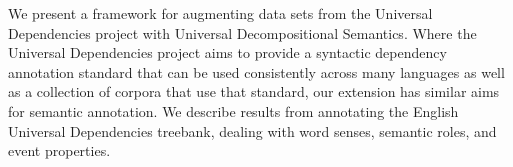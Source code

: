 We present a framework for augmenting data sets from the Universal Dependencies project with Universal Decompositional Semantics. Where the Universal Dependencies project aims to provide a syntactic dependency annotation standard that can be used consistently across many languages as well as a collection of corpora that use that standard, our extension has similar aims for semantic annotation. We describe results from annotating the English Universal Dependencies treebank, dealing with word senses, semantic roles, and event properties.
